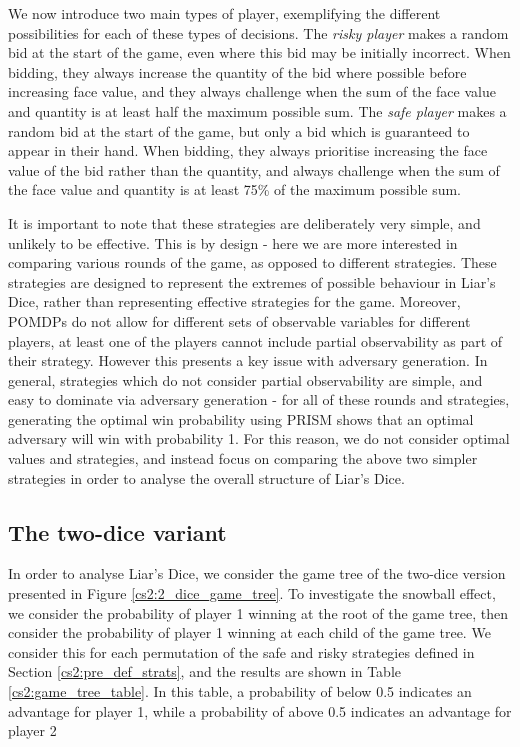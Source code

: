 We now introduce two main types of player, exemplifying the different possibilities for each of these types of decisions. The \emph{risky player} makes a random bid at the start of the game, even where this bid may be initially incorrect. When bidding, they always increase the quantity of the bid where possible before increasing face value, and they always challenge when the sum of the face value and quantity is at least half the maximum possible sum. The \emph{safe player} makes a random bid at the start of the game, but only a bid which is guaranteed to appear in their hand. When bidding, they always prioritise increasing the face value of the bid rather than the quantity, and always challenge when the sum of the face value and quantity is at least 75\% of the maximum possible sum.

It is important to note that these strategies are deliberately very simple, and unlikely to be effective. This is by design - here we are more interested in comparing various rounds of the game, as opposed to different strategies. These strategies are designed to represent the extremes of possible behaviour in Liar's Dice, rather than representing effective strategies for the game. Moreover, POMDPs do not allow for different sets of observable variables for different players, at least one of the players cannot include partial observability as part of their strategy. However this presents a key issue with adversary generation. In general, strategies which do not consider partial observability are simple, and easy to dominate via adversary generation - for all of these rounds and strategies, generating the optimal win probability using PRISM shows that an optimal adversary will win with probability 1. For this reason, we do not consider optimal values and strategies, and instead focus on comparing the above two simpler strategies in order to analyse the overall structure of Liar's Dice.

\subsection{The two-dice variant}

In order to analyse Liar's Dice, we consider the game tree of the two-dice version presented in Figure \ref{cs2:2_dice_game_tree}. To investigate the snowball effect, we consider the probability of player 1 winning at the root of the game tree, then consider the probability of player 1 winning at each child of the game tree. We consider this for each permutation of the safe and risky strategies defined in Section \ref{cs2:pre_def_strats}, and the results are shown in Table \ref{cs2:game_tree_table}. In this table, a probability of below 0.5 indicates an advantage for player 1, while a probability of above 0.5 indicates an advantage for player 2

